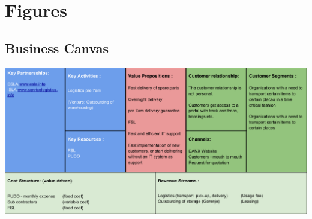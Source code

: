 \chapter{Figures}

\newpage
\section{Business Canvas}
\label{sec:business_canvas}
\includegraphics[angle=270, scale=0.85]{img/Business_Canvas.pdf}